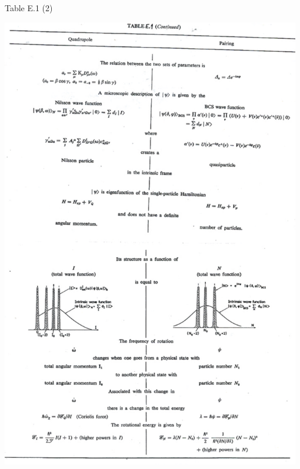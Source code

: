 \documentclass[a4paper,onecolumn,superscriptaddress,12pt,nofootinbib,twoside,raggedfooter,notitlepage]{revtex4-1}
\begin{document}
\pagebreak
Table E.1 (2)
\begin{center}
	\includegraphics[width=0.98\textwidth]{figs/tab_e1_2}
\end{center}
\end{document}
